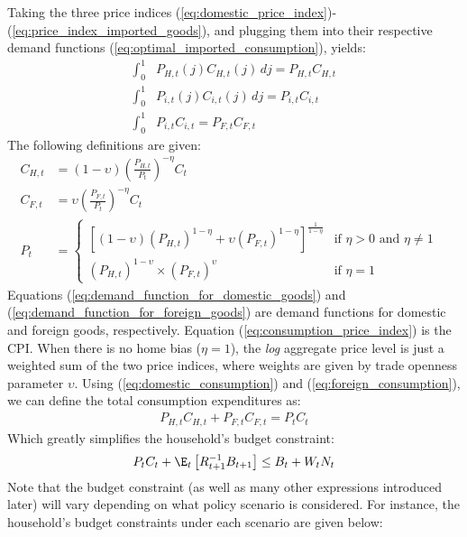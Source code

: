 Taking the three price indices (\ref{eq:domestic_price_index})-(\ref{eq:price_index_imported_goods}), and plugging them into their respective demand functions (\ref{eq:optimal_imported_consumption}), yields:
\begin{align}
 \int_{0}^{1} & P_{H,t}(j)C_{H,t}(j) \,dj = P_{H,t}C_{H,t} \label{eq:domestic_consumption}\\
 \int_{0}^{1} & P_{i,t}(j)C_{i,t}(j) \,dj = P_{i,t}C_{i,t} \\
 \int_{0}^{1} & P_{i,t}C_{i,t} = P_{F,t}C_{F,t} \label{eq:foreign_consumption}
\end{align}
The following definitions are given:
\begin{align}
 C_{H,t} & = (1-\upsilon) {\left(\frac{P_{H,t}}{P_t}\right)}^{-\eta} C_{t} \label{eq:demand_function_for_domestic_goods} & \\
 C_{F,t} & = \upsilon {\left(\frac{P_{F,t}}{P_t}\right)}^{-\eta} C_{t} \label{eq:demand_function_for_foreign_goods} & \\
 P_t &= \begin{cases}
 \left[ (1-\upsilon) (P_{H,t})^{1-\eta} + \upsilon (P_{F,t})^{1-\eta} \right]^{\frac{1}{1-\eta}} \label{eq:consumption_price_index} & \text{if $\eta > 0$ and $\eta \ne 1$}\\
 (P_{H,t})^{1-\upsilon} \times (P_{F,t})^{\upsilon} & \text{if $\eta = 1$}
 \end{cases}
\end{align}
Equations (\ref{eq:demand_function_for_domestic_goods}) and (\ref{eq:demand_function_for_foreign_goods}) are demand functions for domestic and foreign goods, respectively. Equation (\ref{eq:consumption_price_index}) is the CPI. When there is no home bias ($\eta = 1$), the \textit{log} aggregate price level is just a weighted sum of the two price indices, where weights are given by trade openness parameter $\upsilon$. Using (\ref{eq:domestic_consumption}) and (\ref{eq:foreign_consumption}), we can define the total consumption expenditures as:
\begin{align}
 P_{H,t}C_{H,t} + P_{F,t}C_{F,t} = P_t C_t
\end{align}
Which greatly simplifies the household's budget constraint:
\begin{equation}
 P_t C_t + \E_t \left[ R^{-1}_{t+1} B_{t+1} \right] \leq B_t + W_t N_t
\end{equation}
Note that the budget constraint (as well as many other expressions introduced later) will vary depending on what policy scenario is considered. For instance, the household's budget constraints under each scenario are given below:
